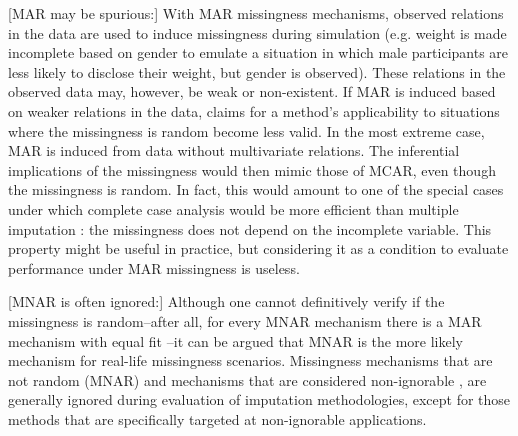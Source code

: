 \documentclass[bimj,fleqn]{w-art}
\begin{document}
[MAR may be spurious:] With MAR missingness mechanisms, observed relations in the data are used to induce missingness during simulation (e.g. weight is made incomplete based on gender to emulate a situation in which male participants are less likely to disclose their weight, but gender is observed). These relations in the observed data may, however, be weak or non-existent. If MAR is induced based on weaker relations in the data, claims for a method's applicability to situations where the missingness is random become less valid. In the most extreme case, MAR is induced from data without multivariate relations. The inferential implications of the missingness would then mimic those of MCAR, even though the missingness is random. In fact, this would amount to one of the special cases under which complete case analysis would be more efficient than multiple imputation \citep[see e.g.][p. 48]{fimd}: the missingness does not depend on the incomplete variable. This property might be useful in practice, but considering it as a condition to evaluate performance under MAR missingness is useless. %



[MNAR is often ignored:] Although one cannot definitively verify if the missingness is random--after all, for every MNAR mechanism there is a MAR mechanism with equal fit \citep{molenberghs2008every}--it can be argued that MNAR is the more likely mechanism for real-life missingness scenarios. Missingness mechanisms that are not random (MNAR) and mechanisms that are considered non-ignorable \citep[see e.g.][]{rubi76}, are generally ignored during evaluation of imputation methodologies, except for those methods that are specifically targeted at non-ignorable applications. 
\end{document}
